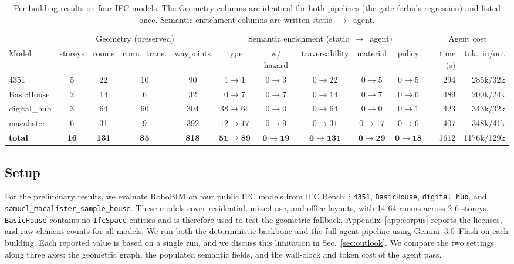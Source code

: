 \documentclass[a4paper, 10pt, conference]{ieeeconf}
\begin{document}
\begin{table}[!t]
\centering
\caption{Per-building results on four IFC models. The Geometry columns are identical for both pipelines (the gate forbids regression) and listed once. Semantic enrichment columns are written \mbox{static~$\rightarrow$~agent}.}
\label{tab:coverage}
\footnotesize
\setlength{\tabcolsep}{4.0pt}
\begin{tabular}{@{}l c c c c | c c c c c | r r@{}}
\toprule
& \multicolumn{4}{c|}{Geometry (preserved)}
  & \multicolumn{5}{c|}{Semantic enrichment (static~$\rightarrow$~agent)}
  & \multicolumn{2}{c}{Agent cost} \\
Model & storeys & rooms & conn.\ trans. & waypoints
    & type & w/ hazard & traversability & material & policy
    & time (s) & tok.\ in/out \\
\midrule
4351          & 5  & 22  & 10 & 90  & $1\!\rightarrow\!1$    & $0\!\rightarrow\!3$  & $0\!\rightarrow\!22$  & $0\!\rightarrow\!5$  & $0\!\rightarrow\!5$ & 294  & 285k/32k \\
BasicHouse    & 2  & 14  & 6  & 32  & $0\!\rightarrow\!7$    & $0\!\rightarrow\!7$  & $0\!\rightarrow\!14$  & $0\!\rightarrow\!7$  & $0\!\rightarrow\!6$ & 489  & 200k/24k \\
digital\_hub  & 3  & 64  & 60 & 304 & $38\!\rightarrow\!64$  & $0\!\rightarrow\!0$  & $0\!\rightarrow\!64$  & $0\!\rightarrow\!0$  & $0\!\rightarrow\!1$ & 423  & 343k/32k \\
macalister    & 6  & 31  & 9  & 392 & $12\!\rightarrow\!17$  & $0\!\rightarrow\!9$  & $0\!\rightarrow\!31$  & $0\!\rightarrow\!17$ & $0\!\rightarrow\!6$ & 407  & 348k/41k \\
\midrule
\textbf{total} & \textbf{16} & \textbf{131} & \textbf{85} & \textbf{818} & $\mathbf{51\!\rightarrow\!89}$ & $\mathbf{0\!\rightarrow\!19}$ & $\mathbf{0\!\rightarrow\!131}$ & $\mathbf{0\!\rightarrow\!29}$ & $\mathbf{0\!\rightarrow\!18}$ & 1612 & 1176k/129k \\
\bottomrule
\end{tabular}
\end{table}

\subsection{Setup}
For the preliminary results, we evaluate RoboBIM on four public IFC models from IFC Bench~\cite{ifc_repo}: \texttt{4351}, \texttt{BasicHouse}, \texttt{digital\_hub}, and \texttt{samuel\_macalister\_sample\_house}. These models cover residential, mixed-use, and office layouts, with 14-64 rooms across 2-6 storeys. \texttt{BasicHouse} contains no \texttt{IfcSpace} entities and is therefore used to test the geometric fallback. Appendix~\ref{app:corpus} reports the licenses, and raw element counts for all models. We run both the deterministic backbone and the full agent pipeline using Gemini~3.0~Flash on each building. Each reported value is based on a single run, and we discuss this limitation in Sec.~\ref{sec:outlook}. We compare the two settings along three axes: the geometric graph, the populated semantic fields, and the wall-clock and token cost of the agent pass.
\end{document}

